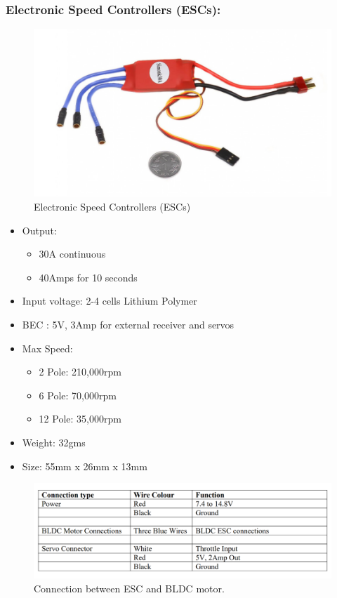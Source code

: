 \subsubsection{Electronic Speed Controllers (ESCs):}
\begin{figure}[h!]
\centering
\includegraphics[width=12cm]{./Figures/esc_qc.png}
\caption{Electronic Speed Controllers (ESCs)}
\label{esc_qc}
\end{figure}

\begin{itemize}
    \item Output: 
    \begin{itemize}
        \item 30A continuous 
        \item 40Amps for 10 seconds
    \end{itemize}
    \item Input voltage: 2-4 cells Lithium Polymer
    \item BEC : 5V, 3Amp for external receiver and servos
    \item Max Speed: 
    \begin{itemize}
        \item 2 Pole: 210,000rpm
        \item 6 Pole: 70,000rpm
        \item 12 Pole: 35,000rpm
    \end{itemize}
    \item Weight: 32gms
    \item Size: 55mm x 26mm x 13mm 
\end{itemize}


\begin{figure}[h!]
\centering
\includegraphics[width=\columnwidth]{./Figures/conn_esc_specs.png}
\caption{Connection between ESC and BLDC motor.}
\label{conn_esc_specs}
\end{figure}


